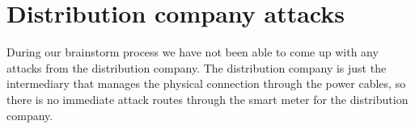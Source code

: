 
\section{Distribution company attacks}
During our brainstorm process we have not been able to come up with any attacks from the distribution company.
The distribution company is just the intermediary that manages the physical connection through the power cables, so there is no immediate attack routes through the smart meter for the distribution company.
